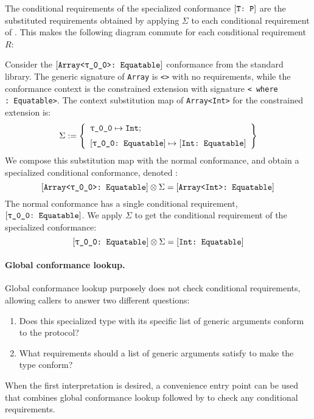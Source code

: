 \documentclass[../generics]{subfiles}
\begin{document}
The conditional requirements of the specialized conformance $[\texttt{T:~P}]$ are the substituted requirements obtained by applying $\Sigma$ to each conditional requirement of . This makes the following diagram commute for each conditional requirement~$R$:
\begin{quote}
\newcommand{\GetConditionalRequirements}{\def\arraystretch{0.65}\arraycolsep=0pt\begin{array}{c}\text{get conditional}\\\text{requirement}\end{array}}
\end{quote}

Consider the $\ConfReq{Array<\ttgp{0}{0}>}{Equatable}$ conformance from the standard library. The generic signature of \texttt{Array} is \texttt{<>} with no requirements, while the conformance context is the constrained extension with signature \texttt{< where :~Equatable>}. The context substitution map of \texttt{Array<Int>} for the constrained extension is:
\[\Sigma := \SubstMapLongC{\SubstType{\ttgp{0}{0}}{Int}}{\SubstConf{\ttgp{0}{0}}{Int}{Equatable}}\]
We compose this substitution map with the normal conformance, and obtain a specialized conditional conformance, denoted :
\[
\ConfReq{Array<\ttgp{0}{0}>}{Equatable} \otimes \Sigma = \ConfReq{Array<Int>}{Equatable}
\]
The normal conformance has a single conditional requirement, $\ConfReq{\ttgp{0}{0}}{Equatable}$. We apply $\Sigma$ to get the conditional requirement of the specialized conformance:
\[
\ConfReq{\ttgp{0}{0}}{Equatable} \otimes \Sigma = \ConfReq{Int}{Equatable}
\]

\paragraph{Global conformance lookup.}
Global conformance lookup purposely does not check conditional requirements, allowing callers to answer two different questions:
\begin{enumerate}
\item Does this specialized type with its specific list of generic arguments conform to the protocol?
\item What requirements should a list of generic arguments satisfy to make the type conform?
\end{enumerate}
When the first interpretation is desired, a convenience entry point can be used that combines global conformance lookup followed by  to check any conditional requirements.
\end{document}
